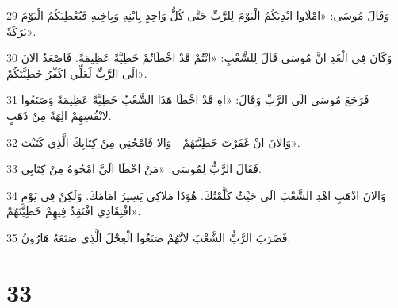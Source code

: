 \par 29 وَقَالَ مُوسَى: «امْلَاوا ايْدِيَكُمُ الْيَوْمَ لِلرَّبِّ حَتَّى كُلُّ وَاحِدٍ بِابْنِهِ وَبِاخِيهِ فَيُعْطِيَكُمُ الْيَوْمَ بَرَكَةً».
\par 30 وَكَانَ فِي الْغَدِ انَّ مُوسَى قَالَ لِلشَّعْبِ: «انْتُمْ قَدْ اخْطَاتُمْ خَطِيَّةً عَظِيمَةً. فَاصْعَدُ الانَ الَى الرَّبِّ لَعَلِّي اكَفِّرُ خَطِيَّتَكُمْ».
\par 31 فَرَجَعَ مُوسَى الَى الرَّبِّ وَقَالَ: «اهِ قَدْ اخْطَا هَذَا الشَّعْبُ خَطِيَّةً عَظِيمَةً وَصَنَعُوا لانْفُسِهِمْ الِهَةً مِنْ ذَهَبٍ.
\par 32 وَالانَ انْ غَفَرْتَ خَطِيَّتَهُمْ - وَالا فَامْحُنِي مِنْ كِتَابِكَ الَّذِي كَتَبْتَ».
\par 33 فَقَالَ الرَّبُّ لِمُوسَى: «مَنْ اخْطَا الَيَّ امْحُوهُ مِنْ كِتَابِي.
\par 34 وَالانَ اذْهَبِ اهْدِ الشَّعْبَ الَى حَيْثُ كَلَّمْتُكَ. هُوَذَا مَلاكِي يَسِيرُ امَامَكَ. وَلَكِنْ فِي يَوْمِ افْتِقَادِي افْتَقِدُ فِيهِمْ خَطِيَّتَهُمْ».
\par 35 فَضَرَبَ الرَّبُّ الشَّعْبَ لانَّهُمْ صَنَعُوا الْعِجْلَ الَّذِي صَنَعَهُ هَارُونُ.

\chapter{33}

